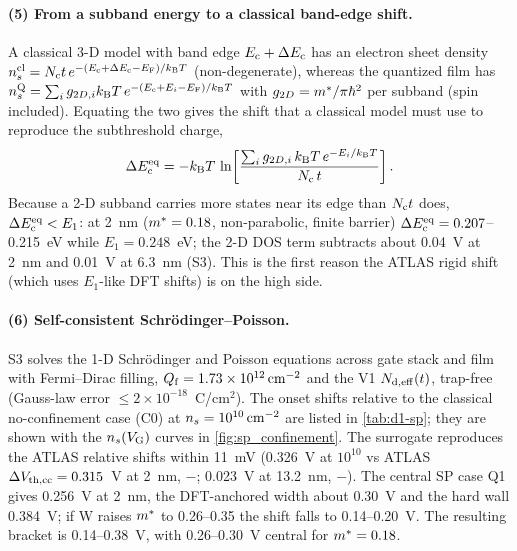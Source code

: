 \paragraph{(5) From a subband energy to a classical band-edge shift.}
A classical 3-D model with band edge $E_{\mathrm{c}}+\Delta E_{\mathrm{c}}$ has an electron sheet density
$n_s^{\mathrm{cl}} = N_{\mathrm{c}} t\,e^{-(E_{\mathrm{c}}+\Delta E_{\mathrm{c}}-E_{\mathrm{F}})/k_{\mathrm{B}}T}$ (non-degenerate), whereas the quantized film has
$n_s^{\mathrm{Q}} = \sum_i g_{2D,i}k_{\mathrm{B}}T\,e^{-(E_{\mathrm{c}}+E_i-E_{\mathrm{F}})/k_{\mathrm{B}}T}$ with $g_{2D} = m^{*}/\pi\hbar^2$ per subband
(spin included). Equating the two gives the shift that a classical model must use to reproduce the
subthreshold charge,
\begin{equation}
  \Delta E_{\mathrm{c}}^{\mathrm{eq}} = -k_{\mathrm{B}}T\,\ln\!\left[\frac{\sum_i g_{2D,i}\,k_{\mathrm{B}}T\,e^{-E_i/k_{\mathrm{B}}T}}{N_{\mathrm{c}}\,t}\right].
  \label{eq:d1-dec-eq}
\end{equation}
Because a 2-D subband carries more states near its edge than $N_{\mathrm{c}} t$ does, $\Delta E_{\mathrm{c}}^{\mathrm{eq}} < E_1$: at 2~nm
($m^{*} = 0.18$, non-parabolic, finite barrier) $\Delta E_{\mathrm{c}}^{\mathrm{eq}} = 0.207$--0.215~eV while $E_1 = 0.248$~eV;
the 2-D DOS term subtracts about 0.04~V at 2~nm and 0.01~V at 6.3~nm (S3). This is the first reason the ATLAS
rigid shift (which uses $E_1$-like DFT shifts) is on the high side.

\paragraph{(6) Self-consistent Schr\"odinger--Poisson.}
S3 solves the 1-D Schr\"odinger and Poisson equations across gate stack and film with Fermi--Dirac filling,
$Q_{\mathrm{f}} = 1.73\times10^{12}\,\mathrm{cm}^{-2}$ and the V1 $N_{\mathrm{d,eff}}(t)$, trap-free (Gauss-law error $\le 2\times10^{-18}$~C/cm$^2$).
The onset shifts relative to the classical no-confinement case (C0) at $n_s = 10^{10}\,\mathrm{cm}^{-2}$ are listed in
\cref{tab:d1-sp}; they are shown with the $n_s(V_{\mathrm{G}})$ curves in \cref{fig:sp_confinement}. The surrogate
reproduces the ATLAS relative shifts within 11~mV (0.326~V at $10^{10}$ vs ATLAS $\Delta V_{\mathrm{th,cc}} = 0.315$~V at 2~nm,
$-$; 0.023~V at 13.2~nm, $-$). The central SP case Q1 gives 0.256~V at
2~nm, the DFT-anchored width about 0.30~V and the hard wall 0.384~V; if W raises $m^{*}$ to 0.26--0.35 the shift
falls to 0.14--0.20~V. The resulting bracket is 0.14--0.38~V, with 0.26--0.30~V central for $m^{*} = 0.18$.

